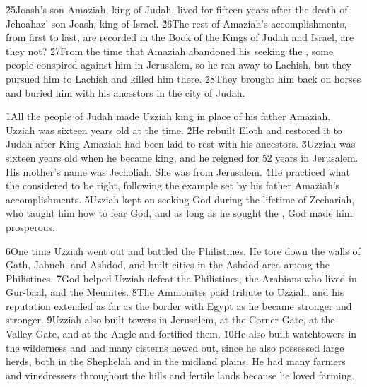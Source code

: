 \v{25}Joash's son Amaziah, king of Judah, lived for fifteen years after the death of Jehoahaz' son Joash, king of Israel. \v{26}The rest of Amaziah's accomplishments, from first to last, are recorded in the Book of the Kings of Judah and Israel, are they not? \v{27}From the time that Amaziah abandoned his seeking the , some people conspired against him in Jerusalem, so he ran away to Lachish, but they pursued him to Lachish and killed him there. \v{28}They brought him back on horses and buried him with his ancestors in the city of Judah.

\v{1}All the people of Judah made Uzziah king in place of his father Amaziah. Uzziah was sixteen years old at the time. \v{2}He rebuilt Eloth and restored it to Judah after King Amaziah had been laid to rest with his ancestors. \v{3}Uzziah was sixteen years old when he became king, and he reigned for 52 years in Jerusalem. His mother's name was Jecholiah. She was from Jerusalem. \v{4}He practiced what the  considered to be right, following the example set by his father Amaziah's accomplishments. \v{5}Uzziah kept on seeking God during the lifetime of Zechariah, who taught him how to fear God, and as long as he sought the , God made him prosperous.

\v{6}One time Uzziah went out and battled the Philistines. He tore down the walls of Gath, Jabneh, and Ashdod, and built cities in the Ashdod area among the Philistines. \v{7}God helped Uzziah defeat the Philistines, the Arabians who lived in Gur-baal, and the Meunites. \v{8}The Ammonites paid tribute to Uzziah, and his reputation extended as far as the border with Egypt as he became stronger and stronger. \v{9}Uzziah also built towers in Jerusalem, at the Corner Gate, at the Valley Gate, and at the Angle and fortified them. \v{10}He also built watchtowers in the wilderness and had many cisterns hewed out, since he also possessed large herds, both in the Shephelah and in the midland plains. He had many farmers and vinedressers throughout the hills and fertile lands because he loved farming.

